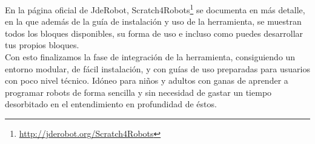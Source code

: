 En la página oficial de JdeRobot, Scratch4Robots\footnote{\url{http://jderobot.org/Scratch4Robots}} se documenta en más detalle, en la que además de la guía de instalación y uso de la herramienta, se muestran todos los bloques disponibles, su forma de uso e incluso como puedes desarrollar tus propios bloques.\\


Con esto finalizamos la fase de integración de la herramienta, consiguiendo un entorno modular, de fácil instalación, y con guías de uso preparadas para usuarios con poco nivel técnico. Idóneo para niños y adultos con ganas de aprender a programar robots de forma sencilla y sin necesidad de gastar un tiempo desorbitado en el entendimiento en profundidad de éstos.

